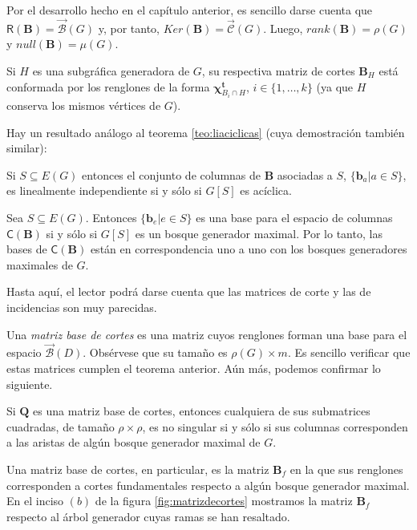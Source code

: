  Por el desarrollo hecho en el capítulo anterior, es sencillo darse cuenta que $\mathsf{R}(\mathbf{B}) =\overrightarrow{\mathcal{B}}(G)$ y, por tanto, $Ker(\mathbf{B}) = \overrightarrow{\mathcal{C}}(G)$. Luego, $rank(\mathbf{B}) = \rho(G)$ y $null(\mathbf{B}) = \mu(G)$.
 
Si $H$ es una subgráfica generadora de $G$, su respectiva matriz de cortes $\mathbf{B}_{H}$ está conformada por los renglones de la forma $\boldsymbol{\chi}_{B_{i} \cap H}^{\mathbf{t}}$, $i\in\{1, \ldots, k\}$ (ya que $H$ conserva los mismos vértices de $G$). 

Hay un resultado análogo al teorema \ref{teo:liaciclicas} (cuya demostración también similar):
\begin{teo}\label{teo:limatrizcortes}
Si $S\subseteq E(G)$ entonces el conjunto de columnas de $\mathbf{B}$ asociadas a $S$, $\{\mathbf{b}_{a}| a \in S\}$, es linealmente independiente si y sólo si $G[S]$ es acíclica.
\end{teo}

\begin{cor} Sea
$S \subseteq E(G)$. Entonces $\{\mathbf{b}_{e} | e \in S\}$ es una base para el espacio de columnas $\mathsf{C}(\mathbf{B})$ si y sólo si $G[S]$ es un bosque generador maximal. Por lo tanto, las bases de $\mathsf{C}(\mathbf{B})$ están en correspondencia uno a uno con los bosques generadores maximales de $G$.
\end{cor} 

Hasta aquí, el lector podrá darse cuenta que las matrices de corte y las de incidencias son muy parecidas.

Una \textit{matriz base de cortes} es una matriz cuyos renglones forman una base para el espacio $\overrightarrow{\mathcal{B}}(D)$. Obsérvese que su tamaño es $\rho(G) \times m$. Es sencillo verificar que estas matrices cumplen el teorema anterior. Aún más, podemos confirmar lo siguiente.

\begin{teo} \label{teo:submatricesmatridecortes}
Si $\mathbf{Q}$ es una matriz base de cortes, entonces cualquiera de sus submatrices cuadradas, de tamaño $\rho \times \rho$, es no singular si y sólo si sus columnas corresponden a las aristas de algún bosque generador maximal de $G$.
\end{teo}

Una matriz base de cortes, en particular, es la matriz $\mathbf{B}_{f}$ en la que sus renglones corresponden a cortes fundamentales respecto a algún bosque generador maximal. En el inciso $(b)$ de la figura \ref{fig:matrizdecortes} mostramos la matriz $\mathbf{B}_{f}$ respecto al árbol generador cuyas ramas se han resaltado.

